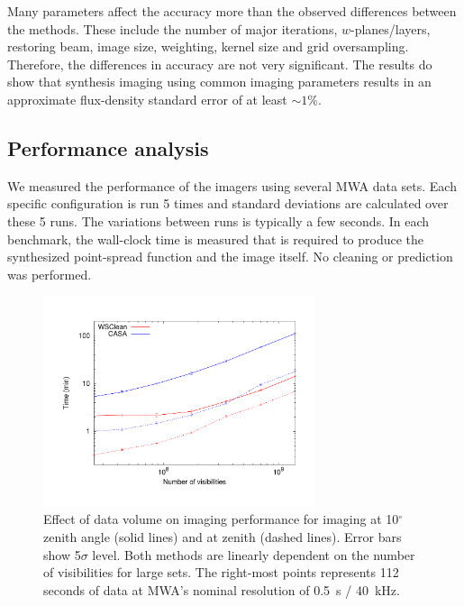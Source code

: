 \documentclass[useAMS,usenatbib]{mn2e}
\newcommand{\degree}{\ensuremath{^{\circ}}\xspace}
\begin{document}
Many parameters affect the accuracy more than the observed differences between the methods. These include the number of major iterations, $w$-planes/layers, restoring beam, image size, weighting, kernel size and grid oversampling. Therefore, the differences in accuracy are not very significant. The results do show that synthesis imaging using common imaging parameters results in an approximate flux-density standard error of at least $\sim1\%$.

\subsection{Performance analysis}
We measured the performance of the imagers using several MWA data sets. Each specific configuration is run 5 times and standard deviations are calculated over these 5 runs. The variations between runs is typically a few seconds. In each benchmark, the wall-clock time is measured that is required to produce the synthesized point-spread function and the image itself. No cleaning or prediction was performed.

\begin{figure}
\begin{center}
\includegraphics[width=8cm]{img/benchmark-nsamples/nsamples}
\caption{Effect of data volume on imaging performance for imaging at 10\degree zenith angle (solid lines) and at zenith (dashed lines). Error bars show 5$\sigma$ level. Both methods are linearly dependent on the number of visibilities for large sets. The right-most points represents 112 seconds of data at MWA's nominal resolution of 0.5~s / 40~kHz. }
\label{fig:timing-nsamples}
\end{center}
\end{figure}
\end{document}
